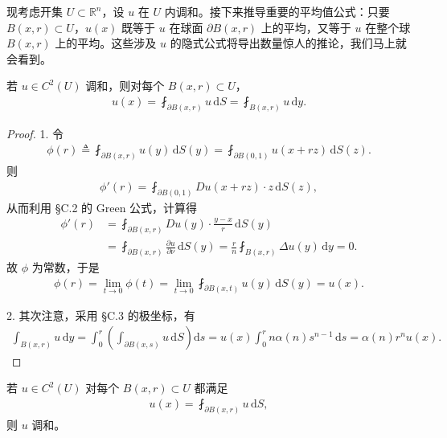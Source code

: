 \documentclass[../../main.tex]{subfiles}
\begin{document}
现考虑开集 $U\subset\mathbb{R}^n$，设 $u$ 在 $U$ 内调和。接下来推导重要的平均值公式：只要 $B(x,r)\subset U$，$u(x)$ 既等于 $u$ 在球面 $\partial B(x,r)$ 上的平均，又等于 $u$ 在整个球 $B(x,r)$ 上的平均。这些涉及 $u$ 的隐式公式将导出数量惊人的推论，我们马上就会看到。

\begin{theorem}[Laplace方程的平均值公式]\label{theorem:ch02-mean-value}若 $u\in C^2(U)$ 调和，则对每个 $B(x,r)\subset U$，
\begin{align}\label{align:ch02-mean-value}
u(x)=\fint_{\partial B(x,r)}u\,\mathrm{d}S=\fint_{B(x,r)}u\,\mathrm{d}y.
\end{align}
\end{theorem}

\begin{proof}
1. 令
\begin{align*}
\phi(r)\triangleq\fint_{\partial B(x,r)}u(y)\,\mathrm{d}S(y)=\fint_{\partial B(0,1)}u(x+rz)\,\mathrm{d}S(z).
\end{align*}
则
\begin{align*}
\phi'(r)=\fint_{\partial B(0,1)}Du(x+rz)\cdot z\,\mathrm{d}S(z),
\end{align*}
从而利用 \S C.2 的 Green 公式，计算得
\begin{align*}
\phi'(r)&=\fint_{\partial B(x,r)}Du(y)\cdot\frac{y-x}{r}\,\mathrm{d}S(y)\\
&=\fint_{\partial B(x,r)}\frac{\partial u}{\partial\nu}\,\mathrm{d}S(y)
=\frac{r}{n}\fint_{B(x,r)}\Delta u(y)\,\mathrm{d}y=0.
\end{align*}
故 $\phi$ 为常数，于是
\begin{align*}
\phi(r)=\lim_{t\to 0}\phi(t)=\lim_{t\to 0}\fint_{\partial B(x,t)}u(y)\,\mathrm{d}S(y)=u(x).
\end{align*}

2. 其次注意，采用 \S C.3 的极坐标，有
\begin{align*}
\int_{B(x,r)}u\,\mathrm{d}y=\int_0^r\left(\int_{\partial B(x,s)}u\,\mathrm{d}S\right)\mathrm{d}s
=u(x)\int_0^r n\alpha(n)s^{n-1}\,\mathrm{d}s=\alpha(n)r^n u(x).
\end{align*}
\end{proof}

\begin{theorem}[平均值性质的逆]\label{theorem:ch02-mean-converse}若 $u\in C^2(U)$ 对每个 $B(x,r)\subset U$ 都满足
\begin{align*}
u(x)=\fint_{\partial B(x,r)}u\,\mathrm{d}S,
\end{align*}
则 $u$ 调和。
\end{theorem}
\end{document}

